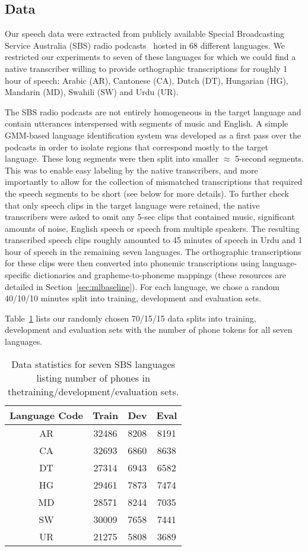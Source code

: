
\subsection{Data}
\label{sec:data}

Our speech data were extracted from publicly available Special Broadcasting Service Australia (SBS) radio podcasts~\cite{SBS} hosted in 68 different languages. We restricted our experiments to seven of these languages for which we could find a native transcriber willing to provide orthographic transcriptions for roughly 1 hour of speech: Arabic (AR), Cantonese (CA), Dutch (DT), Hungarian (HG), Mandarin (MD), Swahili (SW) and Urdu (UR).

The SBS radio podcasts are not entirely homogeneous in the target language and contain utterances interspersed with segments of music and English. A simple GMM-based language identification system was developed as a first pass over the podcasts in order to isolate regions that correspond mostly to the target language. These long segments were then split into smaller $\approx$ 5-second segments. This was to enable easy labeling by the native transcribers, and more importantly to allow for the collection of mismatched transcriptions that required the speech segments to be short (see below for more details). To further check that only speech clips in the target language were retained, the native transcribers were asked to omit any 5-sec clips that contained music, significant amounts of noise, English speech or speech from multiple speakers. The resulting transcribed speech clips roughly amounted to 45 minutes of speech in Urdu and 1 hour of speech in the remaining seven languages. The orthographic transcriptions for these clips were then converted into phonemic transcriptions using language-specific dictionaries and grapheme-to-phoneme mappings (these resources are detailed in Section~\ref{sec:mlbaseline}). For each language, we chose a random 40/10/10 minutes split into training, development and evaluation sets. 

Table~\ref{tab:data} lists our randomly chosen 70/15/15 data splits into training, development and evaluation sets with the number of phone tokens for all seven languages. 

\begin{table}[t]
\centering
\begin{tabular}{| c || c | c | c |}
\hline
Language Code & Train & Dev & Eval \\
\hline
AR & 32486 & 8208 & 8191\\
CA & 32693 & 6860 & 8638 \\
DT & 27314 & 6943 & 6582 \\
HG & 29461 & 7873 & 7474\\
MD & 28571 & 8244 & 7035\\
SW & 30009 & 7658 & 7441 \\
UR & 21275 & 5808 & 3689 \\
\hline
\end{tabular}
\caption{Data statistics for seven SBS languages listing number of phones in thetraining/development/evaluation sets.}
\label{tab:data}
\end{table}

